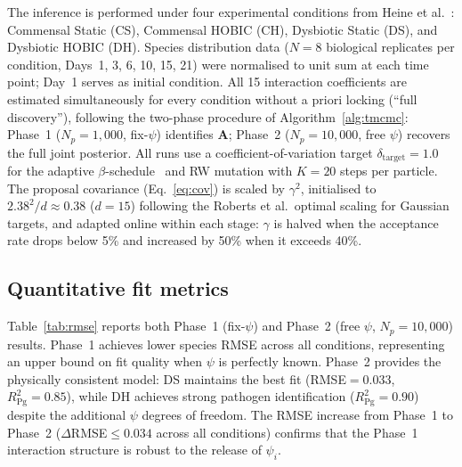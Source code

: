\documentclass[11pt,a4paper]{article}
\begin{document}
The inference is performed under four experimental conditions from Heine et al.~\cite{Heine2025PeriImplant}: Commensal Static (CS), Commensal HOBIC (CH), Dysbiotic Static (DS), and Dysbiotic HOBIC (DH).
Species distribution data ($N=8$ biological replicates per condition, Days~1, 3, 6, 10, 15, 21) were normalised to unit sum at each time point; Day~1 serves as initial condition.
All 15 interaction coefficients are estimated simultaneously for every condition without a priori locking (``full discovery''), following the two-phase procedure of Algorithm~\ref{alg:tmcmc}: Phase~1 ($N_p=1{,}000$, fix-$\psi$) identifies $\mathbf{A}$; Phase~2 ($N_p=10{,}000$, free $\psi$) recovers the full joint posterior.
All runs use a coefficient-of-variation target $\delta_{\mathrm{target}}=1.0$ for the adaptive $\beta$-schedule~\cite{Betz2016TMCMC} and RW mutation with $K=20$ steps per particle.
The proposal covariance (Eq.~\ref{eq:cov}) is scaled by $\gamma^2$, initialised to $2.38^2/d\approx0.38$ ($d=15$) following the Roberts et al.\ optimal scaling for Gaussian targets, and adapted online within each stage: $\gamma$ is halved when the acceptance rate drops below 5\% and increased by 50\% when it exceeds 40\%.

\subsection{Quantitative fit metrics}

Table~\ref{tab:rmse} reports both Phase~1 (fix-$\psi$) and Phase~2 (free $\psi$, $N_p=10{,}000$) results.
Phase~1 achieves lower species RMSE across all conditions, representing an upper bound on fit quality when $\psi$ is perfectly known.
Phase~2 provides the physically consistent model: DS maintains the best fit (RMSE$=$0.033, $R^2_{\text{Pg}}=0.85$), while DH achieves strong pathogen identification ($R^2_{\text{Pg}}=0.90$) despite the additional $\psi$ degrees of freedom.
The RMSE increase from Phase~1 to Phase~2 ($\Delta$RMSE$\leq0.034$ across all conditions) confirms that the Phase~1 interaction structure is robust to the release of $\psi_i$.
\end{document}
